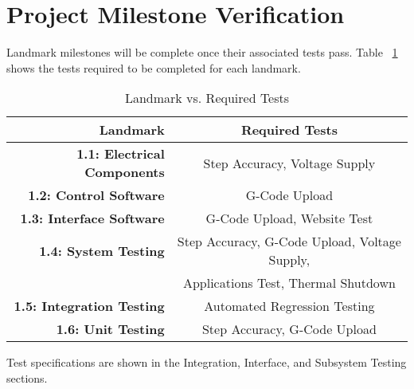 \section{Project Milestone Verification}
Landmark milestones will be complete once their associated tests pass.
Table ~\ref{table:testvsland} shows the tests required to be completed for each landmark.

\begin{table}[H]
	\caption{Landmark vs. Required Tests}
	\label{table:testvsland}
	\centering
	\begin{tabular}{|r |c|} 
		\hline\hline
		\textbf{Landmark} & \textbf{Required Tests}\\
		\hline
		\textbf{1.1: Electrical Components} & Step Accuracy, Voltage Supply  \\
		\hline
		\textbf{1.2: Control Software} & G-Code Upload  \\
		\hline
		\textbf{1.3: Interface Software} & G-Code Upload, Website Test \\
		\hline
		\textbf{1.4: System Testing} & Step Accuracy, G-Code Upload, Voltage Supply,\\
 		& Applications Test, Thermal Shutdown\\
		\hline
		\textbf{1.5: Integration Testing} & Automated Regression Testing\\
		\hline
		\textbf{1.6: Unit Testing} & Step Accuracy, G-Code Upload\\
		\hline 
	\end{tabular}
\end{table}
Test specifications are shown in the Integration, Interface, and Subsystem Testing sections.

